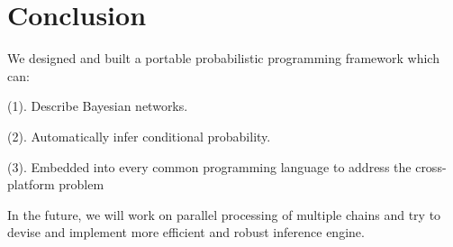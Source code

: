 \chapter{Conclusion}
\label{chap:conclusion}
We designed and built a portable probabilistic programming framework which can:

(1). Describe Bayesian networks. 

(2). Automatically infer conditional probability.

(3). Embedded into every common programming language to address the cross-platform problem

In the future, we will work on parallel processing of multiple chains and try to devise and implement more efficient and robust inference engine.

